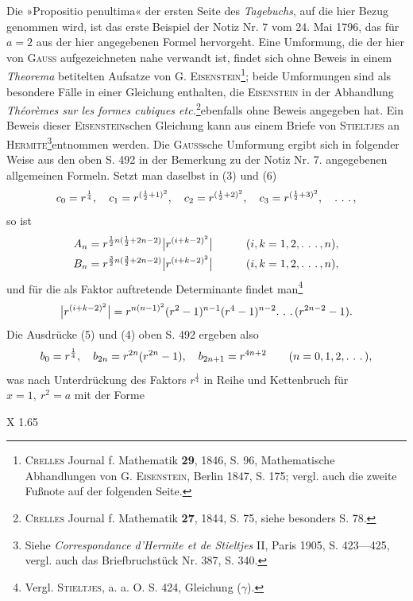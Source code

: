 \medskip\begingroup\small
\indent Die »Propositio penultima« der ersten Seite des \textit{Tagebuchs}, auf die hier Bezug genommen wird, ist das erste Beispiel der Notiz Nr. 7 vom 24. Mai 1796, das für \(a=2\) aus der hier angegebenen Formel hervorgeht. Eine Umformung, die der hier von \textsc{Gauss} aufgezeichneten nahe verwandt ist, findet sich ohne Beweis in einem \textit{Theorema} betitelten Aufsatze von G. \textsc{Eisenstein}\footnote{\textsc{Crelles} Journal f. Mathematik \textbf{29}, 1846, S. 96, Mathematische Abhandlungen von G. \textsc{Eisenstein}, Berlin 1847, S. 175; vergl. auch die zweite Fußnote auf der folgenden Seite.}; beide Umformungen sind als besondere Fälle in einer Gleichung enthalten, die \textsc{Eisenstein} in der Abhandlung \textit{Théorèmes sur les formes cubiques etc.}\begingroup\renewcommand{\thefootnote}{**)}\footnote{\textsc{Crelles} Journal f. Mathematik \textbf{27}, 1844, S. 75, siehe besonders S. 78.}\endgroup ebenfalls ohne Beweis angegeben hat. Ein Beweis dieser \textsc{Eisenstein}schen Gleichung kann aus einem Briefe von \textsc{Stieltjes} an \textsc{Hermite}\begingroup\renewcommand{\thefootnote}{***)}\footnote{Siehe \textit{Correspondance d’Hermite et de Stieltjes} II, Paris 1905, S. 423—425, vergl. auch das Briefbruchstück Nr. 387, S. 340.}\endgroup entnommen werden. Die \textsc{Gauss}sche Umformung ergibt sich in folgender Weise aus den oben S. 492 in der Bemerkung zu der Notiz Nr. 7. angegebenen allgemeinen Formeln. Setzt man daselbst in (3) und (6)
\[
c_0=r^{\frac14},\quad c_1=r^{(\frac12+1)^2},\quad c_2=r^{(\frac12+2)^2},\quad c_3=r^{(\frac12+3)^2},\quad\ldotp\,\ldotp\,\ldotp,
\]
\noindent so ist
\[
\begin{aligned}
A_n&=r^{\frac12n(\frac12+2n-2)}\bigl|r^{(i+k-2)^2}\bigr|&\qquad(i,k&=1,2,\ldotp\,\ldotp\,\ldotp,n),\\
B_n&=r^{\frac32n(\frac32+2n-2)}\bigl|r^{(i+k-2)^2}\bigr|&\qquad(i,k&=1,2,\ldotp\,\ldotp\,\ldotp,n),
\end{aligned}
\]
\noindent und für die als Faktor auftretende Determinante findet man\begingroup\renewcommand{\thefootnote}{\(\dagger\))}\footnote{Vergl. \textsc{Stieltjes}, a. a. O. S. 424, Gleichung (\(\gamma\)).}\endgroup
\[
\bigl|r^{(i+k-2)^2}\bigr|=r^{n(n-1)^2}(r^2-1)^{n-1}(r^4-1)^{n-2}\ldotp\,\ldotp\,\ldotp(r^{2n-2}-1).
\]
\noindent Die Ausdrücke (5) und (4) oben S. 492 ergeben also
\[
b_0=r^{\frac14},\quad b_{2n}=r^{2n}(r^{2n}-1),\quad b_{2n+1}=r^{4n+2}\qquad(n=0,1,2,\ldotp\,\ldotp\,\ldotp),
\]
\noindent was nach Unterdrückung des Faktors \(r^{\frac14}\) in Reihe und Kettenbruch für \(x=1,\ r^2=a\) mit der Forme
\par\vfill\noindent X 1.\hfill65
\par\endgroup


